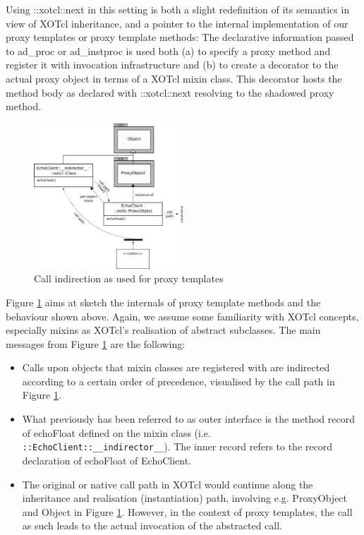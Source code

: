 Using ::xotcl::next in this setting is both a slight redefinition of its semantics in view of XOTcl inheritance, and a pointer to the internal implementation of our proxy templates or proxy template methods: The declarative information passed to ad\_proc or ad\_instproc is used both (a) to specify a proxy method and register it with invocation infrastructure and (b) to create a decorator to the actual proxy object in terms of a XOTcl mixin class. This decorator hosts the method body as declared with ::xotcl::next resolving to the shadowed proxy method.

\begin{figure}[htbp]
\begin{center}
\includegraphics[width=0.5\textwidth]{img/proxy-template.png}
\caption{Call indirection as used for proxy templates}
\label{fig:advanced:templates:1}
\end{center}
\end{figure}

Figure \ref{fig:advanced:templates:1} aims at sketch the internals of proxy template methods and the behaviour shown above. Again, we assume some familiarity with XOTcl concepts, especially mixins as XOTcl's realisation of abstract subclasses. The main messages from Figure \ref{fig:advanced:templates:1} are the following:
\begin{itemize}
\item Calls upon objects that mixin classes are registered with are indirected according to a certain order of precedence, visualised by the call path in Figure  \ref{fig:advanced:templates:1}.
\item What previously has been referred to as outer interface is the method record of echoFloat defined on the mixin class (i.e. \lstinline!::EchoClient::__indirector__!). The inner record refers to the record declaration of echoFloat of EchoClient.
\item The original or native call path in XOTcl would continue along the inheritance and realisation (instantiation) path, involving e.g. ProxyObject and Object in Figure  \ref{fig:advanced:templates:1}. However, in the context of proxy templates, the call as such leads to the actual invocation of the abstracted call.
\end{itemize}
